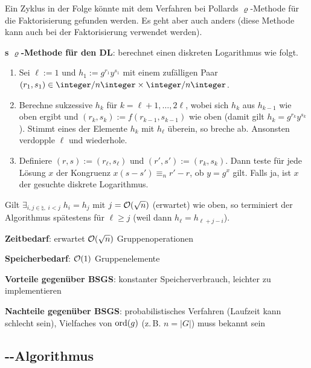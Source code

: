 \linie

Ein Zyklus in der Folge könnte mit dem Verfahren bei Pollards $\varrho$-Methode für die
Faktorisierung gefunden werden.
Es geht aber auch anders (diese Methode kann auch bei der Faktorisierung verwendet werden).

\textbf{s $\varrho$-Methode für den DL}:
 berechnet einen
diskreten Logarithmus wie folgt.
\begin{enumerate}
    \item
    Sei $\ell := 1$ und $h_1 := g^{r_1} y^{s_1}$ mit einem zufälligen Paar
    $(r_1, s_1) \in \ZnZ \times \ZnZ$.
    
    \item
    Berechne sukzessive $h_k$ für $k = \ell + 1, \dotsc, 2\ell$,
    wobei sich $h_k$ aus $h_{k-1}$ wie oben ergibt
    und $(r_k, s_k) := f(r_{k-1}, s_{k-1})$ wie oben
    (damit gilt $h_k = g^{r_k} y^{s_k}$).
    Stimmt eines der Elemente $h_k$ mit $h_\ell$ überein, so breche ab.
    Ansonsten verdopple $\ell$ und wiederhole.
    
    \item
    Definiere $(r, s) := (r_\ell, s_\ell)$ und $(r', s') := (r_k, s_k)$.
    Dann teste für jede Lösung $x$ der Kongruenz $x(s - s') \equiv_n r' - r$, ob $y = g^x$ gilt.
    Falls ja, ist $x$ der gesuchte diskrete Logarithmus.
\end{enumerate}
Gilt $\exists_{i, j \in \natural,\; i < j}\; h_i = h_j$ mit $j = \mathcal{O}(\sqrt{n})$ (erwartet)
wie oben, so terminiert der Algorithmus spätestens für $\ell \ge j$
(weil dann $h_\ell = h_{\ell+j-i}$).

\linie

\textbf{Zeitbedarf}:
erwartet $\mathcal{O}(\sqrt{n})$ Gruppenoperationen

\textbf{Speicherbedarf}:
$\mathcal{O}(1)$ Gruppenelemente

\linie

\textbf{Vorteile gegenüber BSGS}:
konstanter Speicherverbrauch,
leichter zu implementieren

\textbf{Nachteile gegenüber BSGS}:
probabilistisches Verfahren (Laufzeit kann schlecht sein),
Vielfaches von $\operatorname{ord}(g)$ (z.\,B. $n = |G|$) muss bekannt sein

\pagebreak

\subsection{%
    --Algorithmus%
}

